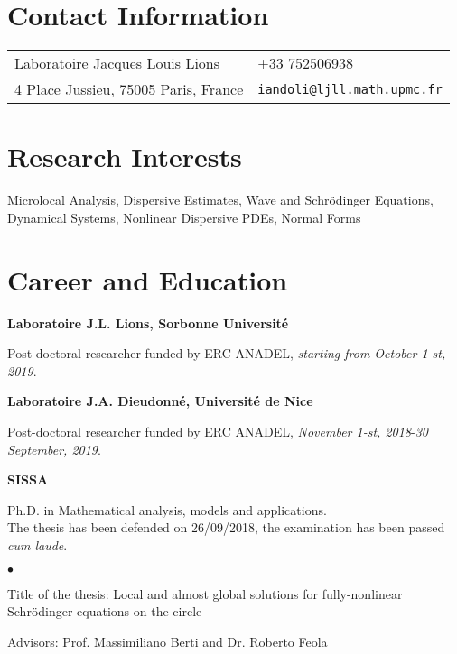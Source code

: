 \documentclass[margin,line,pifont,palatino,courier]{res}
\newenvironment{list1}{
  \begin{list}{\ding{113}}{%
      \setlength{\itemsep}{0in}
      \setlength{\parsep}{0in} \setlength{\parskip}{0in}
      \setlength{\topsep}{0in} \setlength{\partopsep}{0in}
      \setlength{\leftmargin}{0.17in}}}{\end{list}}
\newenvironment{list2}{
  \begin{list}{$\bullet$}{%
      \setlength{\itemsep}{0in}
      \setlength{\parsep}{0in} \setlength{\parskip}{0in}
      \setlength{\topsep}{0in} \setlength{\partopsep}{0in}
      \setlength{\leftmargin}{0.2in}}}{\end{list}}
\begin{document}

\begin{resume}

\section{\sc Contact Information}

\vspace{.05in}
\begin{tabular}{@{}p{2.75in}p{2in}}
Laboratoire Jacques Louis Lions & +33 752506938 \\
  4 Place Jussieu, 75005 Paris, France                  & \verb+iandoli@ljll.math.upmc.fr+\\
                       \end{tabular}

\section{\sc Research Interests}
Microlocal Analysis, Dispersive Estimates, Wave and Schr\"odinger Equations, Dynamical Systems, Nonlinear Dispersive PDEs, Normal Forms

\section{\sc Career and Education}

{\bf Laboratoire J.L. Lions, Sorbonne Universit\'e}\\
\vspace*{-.2in}
\begin{list1}
\item[] Post-doctoral researcher funded by {ERC ANADEL}, \emph{starting from October 1-st, 2019}.
\end{list1}
{\bf Laboratoire J.A. Dieudonn\'e, Universit\'e de Nice }\\
\vspace*{-.2in}
\begin{list1}
\item[] Post-doctoral researcher funded by {ERC ANADEL},  \emph{November 1-st, 2018}-\emph{30 September, 2019}.
\end{list1}
{\bf SISSA}\\
\vspace*{-.2in}
\begin{list1}
\item[] Ph.D. in Mathematical analysis, models and applications.\\
The thesis has been defended on 26/09/2018, the examination has been passed \emph{cum laude}. 
\begin{list2}
\item Title of the thesis:  Local and almost global solutions for  fully-nonlinear Schr\"odinger equations on the circle
\item Advisors:  Prof. Massimiliano Berti and Dr. Roberto Feola
\end{list2}
\end{list1}


\end{resume}
\end{document}
